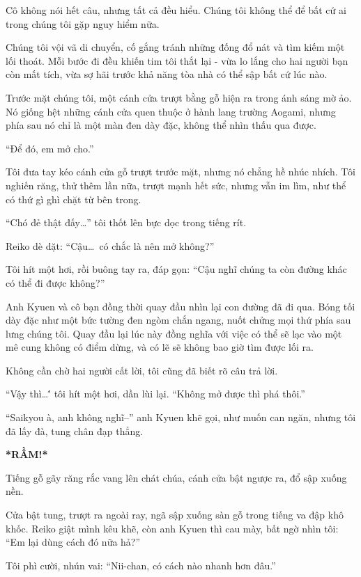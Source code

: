 \documentclass[../main.tex]{subfiles}
\begin{document}
Cô không nói hết câu, nhưng tất cả đều hiểu. Chúng tôi không thể để bất cứ ai trong chúng tôi gặp nguy hiểm nữa.

Chúng tôi vội vã di chuyển, cố gắng tránh những đống đổ nát và tìm kiếm một lối thoát. Mỗi bước đi đều khiến tim tôi thắt lại - vừa lo lắng cho hai người bạn còn mất tích, vừa sợ hãi trước khả năng tòa nhà có thể sập bất cứ lúc nào.

Trước mặt chúng tôi, một cánh cửa trượt bằng gỗ hiện ra trong ánh sáng mờ ảo. Nó giống hệt những cánh cửa quen thuộc ở hành lang trường Aogami, nhưng phía sau nó chỉ là một màn đen dày đặc, không thể nhìn thấu qua được.


``Để đó, em mở cho.''

Tôi đưa tay kéo cánh cửa gỗ trượt trước mặt, nhưng nó chẳng hề nhúc nhích. Tôi nghiến răng, thử thêm lần nữa, trượt mạnh hết sức, nhưng vẫn im lìm, như thể có thứ gì ghì chặt từ bên trong.

``Chó đẻ thật đấy\dots'' tôi thốt lên bực dọc trong tiếng rít.

Reiko dè dặt: ``Cậu\dots\ có chắc là nên mở không?''

Tôi hít một hơi, rồi buông tay ra, đáp gọn: ``Cậu nghĩ chúng ta còn đường khác có thể đi được không?''

Anh Kyuen và cô bạn đồng thời quay đầu nhìn lại con đường đã đi qua. Bóng tối dày đặc như một bức tường đen ngòm chắn ngang, nuốt chửng mọi thứ phía sau lưng chúng tôi. Quay đầu lại lúc này đồng nghĩa với việc có thể sẽ lạc vào một mê cung không có điểm dừng, và có lẽ sẽ không bao giờ tìm được lối ra.

Không cần chờ hai người cất lời, tôi cũng đã biết rõ câu trả lời.

``Vậy thì\dots\'' tôi hít một hơi, dần lùi lại. ``Không mở được thì phá thôi.''

``Saikyou à, anh không nghĩ--'' anh Kyuen khẽ gọi, như muốn can ngăn, nhưng tôi đã lấy đà, tung chân đạp thẳng.

\textbf{*RẦM!*}

Tiếng gỗ gãy răng rắc vang lên chát chúa, cánh cửa bật ngược ra, đổ sập xuống nền.

Cửa bật tung, trượt ra ngoài ray, ngã sập xuống sàn gỗ trong tiếng va đập khô khốc. Reiko giật mình kêu khẽ, còn anh Kyuen thì cau mày, bất ngờ nhìn tôi: ``Em lại dùng cách đó nữa hả?''

Tôi phì cười, nhún vai: ``Nii-chan, có cách nào nhanh hơn đâu.''
\end{document}

